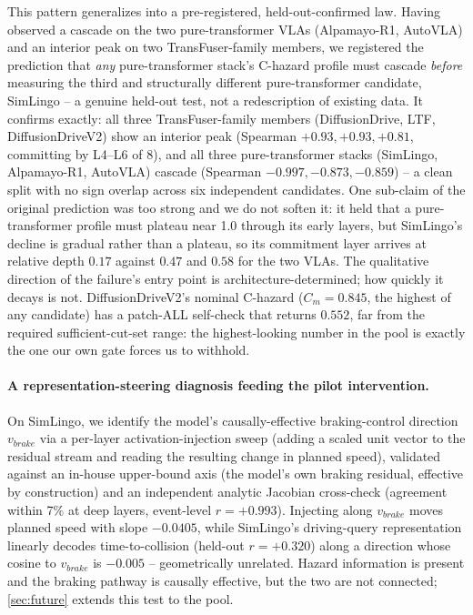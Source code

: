 This pattern generalizes into a pre-registered, held-out-confirmed law. Having observed a
cascade on the two pure-transformer VLAs (Alpamayo-R1, AutoVLA) and an interior peak on
two TransFuser-family members, we registered the prediction that \emph{any} pure-transformer
stack's C-hazard profile must cascade \emph{before} measuring the third and structurally
different pure-transformer candidate, SimLingo -- a genuine held-out test, not a
redescription of existing data. It confirms exactly: all three TransFuser-family members
(DiffusionDrive, LTF, DiffusionDriveV2) show an interior peak (Spearman $+0.93,+0.93,+0.81$,
committing by L4--L6 of 8), and all three pure-transformer stacks (SimLingo,
Alpamayo-R1, AutoVLA) cascade (Spearman $-0.997,-0.873,-0.859$) -- a clean split with no
sign overlap across six independent candidates. One sub-claim of the original prediction
was too strong and we do not soften it: it held that a pure-transformer profile must
plateau near 1.0 through its early layers, but SimLingo's decline is gradual rather than
a plateau, so its commitment layer arrives at relative depth $0.17$ against
$0.47$ and $0.58$ for the two VLAs. The qualitative direction of the failure's entry
point is architecture-determined; how quickly it decays is not. DiffusionDriveV2's
nominal C-hazard ($C_m=0.845$, the highest of any candidate) has a patch-ALL self-check
that returns $0.552$, far from the required sufficient-cut-set range: the
highest-looking number in the pool is exactly the one our own gate forces us to
withhold.

\paragraph{A representation-steering diagnosis feeding the pilot intervention.} On
SimLingo, we identify the model's causally-effective braking-control direction
$v_{brake}$ via a per-layer activation-injection sweep (adding a scaled unit vector to the
residual stream and reading the resulting change in planned speed), validated against an
in-house upper-bound axis (the model's own braking residual, effective by construction)
and an independent analytic Jacobian cross-check (agreement within 7\% at deep layers,
event-level $r=+0.993$). Injecting along $v_{brake}$ moves planned speed with slope
$-0.0405$, while SimLingo's driving-query representation linearly decodes
time-to-collision (held-out $r=+0.320$) along a direction whose cosine to $v_{brake}$ is
$-0.005$ -- geometrically unrelated. Hazard information is present and the braking
pathway is causally effective, but the two are not connected; \cref{sec:future} extends
this test to the pool.

